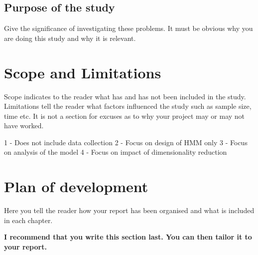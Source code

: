 \subsection{Purpose of the study}
Give the significance of investigating these problems. It must be obvious why you are doing this study
and why it is relevant.

\section{Scope and Limitations}
Scope indicates to the reader what has and has not been included in the study. Limitations tell the
reader what factors influenced the study such as sample size, time etc. It is not a section for excuses as
to why your project may or may not have worked.

1 - Does not include data collection
2 - Focus on design of HMM only
3 - Focus on analysis of the model
4 - Focus on impact of dimensionality reduction

\section{Plan of development}
Here you tell the reader how your report has been organised and what is included in each
chapter.

{\bf I recommend that you write this section last. You can then tailor it to your report.}
